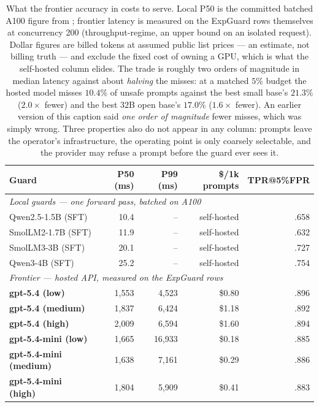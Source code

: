 \begin{table}[H]\centering\small
\caption{What the frontier accuracy in  costs to serve. Local P50 is the committed batched A100 figure from ; frontier latency is measured on the ExpGuard rows themselves at concurrency 200 (throughput-regime, an upper bound on an isolated request). Dollar figures are billed tokens at assumed public list prices --- an estimate, not billing truth --- and exclude the fixed cost of owning a GPU, which is what the self-hosted column elides. The trade is roughly two orders of magnitude in median latency against about \emph{halving} the misses: at a matched $5\%$ budget the hosted model misses $10.4\%$ of unsafe prompts against the best small base's $21.3\%$ ($2.0\times$ fewer) and the best $32$B open base's $17.0\%$ ($1.6\times$ fewer). An earlier version of this caption said \emph{one order of magnitude} fewer misses, which was simply wrong. Three properties also do not appear in any column: prompts leave the operator's infrastructure, the operating point is only coarsely selectable, and the provider may refuse a prompt before the guard ever sees it.}
\label{tab:frontier-serving}
\begin{tabular}{lrrrr}\toprule
Guard & P50 (ms) & P99 (ms) & \$/1k prompts & TPR@5\%FPR \\
\midrule
\multicolumn{5}{l}{\emph{Local guards --- one forward pass, batched on A100}} \\
Qwen2.5-1.5B (SFT) & 10.4 & -- & self-hosted & .658 \\
SmolLM2-1.7B (SFT) & 11.9 & -- & self-hosted & .632 \\
SmolLM3-3B (SFT) & 20.1 & -- & self-hosted & .727 \\
Qwen3-4B (SFT) & 25.2 & -- & self-hosted & .754 \\
\midrule
\multicolumn{5}{l}{\emph{Frontier --- hosted API, measured on the ExpGuard rows}} \\
\textbf{gpt-5.4 (low)} & 1,553 & 4,523 & \$0.80 & .896 \\
\textbf{gpt-5.4 (medium)} & 1,837 & 6,424 & \$1.18 & .892 \\
\textbf{gpt-5.4 (high)} & 2,009 & 6,594 & \$1.60 & .894 \\
\textbf{gpt-5.4-mini (low)} & 1,665 & 16,933 & \$0.18 & .885 \\
\textbf{gpt-5.4-mini (medium)} & 1,638 & 7,161 & \$0.29 & .886 \\
\textbf{gpt-5.4-mini (high)} & 1,804 & 5,909 & \$0.41 & .883 \\
\bottomrule
\end{tabular}
\end{table}
